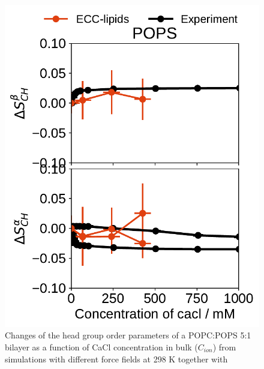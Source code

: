 \begin{figure}[htb!]
  \includegraphics[width=\figwidth]{../img/ecc_pops/order_parameters_changes_A-B_POPS_cacl.pdf} 
  \caption{\label{fig:delta_ordPar_CaCl} 
    Changes of the head group order parameters of a POPC:POPS 5:1 bilayer as a function of CaCl concentration 
    in bulk ($C_{ion}$) from simulations with different force fields at 298 K together with  
  } 
\end{figure} 



